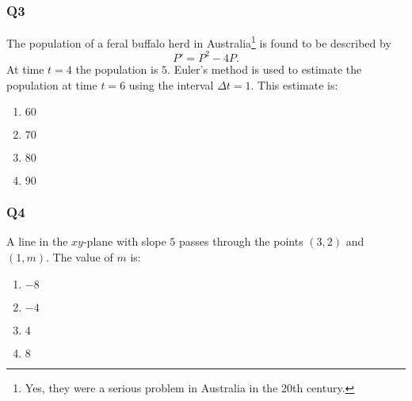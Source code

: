 \documentclass[a4paper,12pt]{article}
\begin{document}
\subsubsection*{Q3}
The population of a feral buffalo herd in Australia\footnote{Yes, they were a serious problem in Australia in the 20th century.} is found to be described by
\[
	P' = P^2 - 4P.
\]
At time $t=4$ the population is $5$. Euler's method is used to estimate the population at time $t=6$ using the interval $\Delta t = 1$. This estimate is:

\begin{enumerate}[label=(\alph*)]
\item $60$
\item $70$
\item $80$
\item $90$
\end{enumerate}

\subsubsection*{Q4}
A line in the $xy$-plane with slope $5$ passes through the points $(3,2)$ and $(1,m)$. The value of $m$ is:
\begin{enumerate}[label=(\alph*)]
\item $-8$
\item $-4$
\item $4$
\item $8$
\end{enumerate}

\newpage
\end{document}
